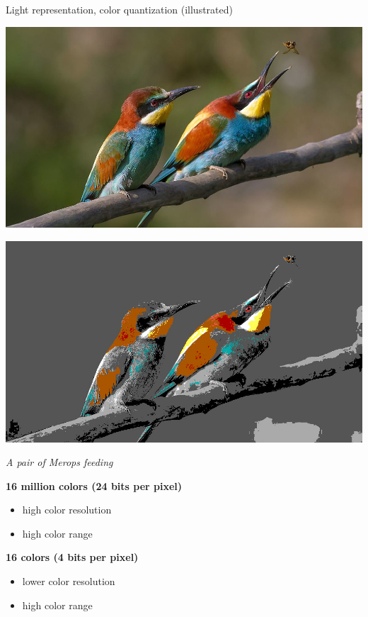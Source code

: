 \begin{frame}{Light representation, color quantization (illustrated)}
  \begin{minipage}[b]{0.45\textwidth}
    \centering
    \includegraphics[width=\textwidth]{slides/graphics-theory/pair-of-merops.jpg}
  \end{minipage}
  \hfill
  \begin{minipage}[b]{0.45\textwidth}
    \centering
    \includegraphics[width=\textwidth]{slides/graphics-theory/pair-of-merops-16-colors-range.jpg}
  \end{minipage}

  \begin{center}
     \textit{\small A pair of Merops feeding}
  \end{center}

  \begin{minipage}[b]{0.45\textwidth}
    \centering
    \textbf{16 million colors (24 bits per pixel)}
    \begin{itemize}
    \item high color resolution
    \item high color range
    \end{itemize}
  \end{minipage}
  \hfill
  \begin{minipage}[b]{0.45\textwidth}
    \centering
    \textbf{16 colors (4 bits per pixel)}
    \begin{itemize}
    \item lower color resolution
    \item high color range
    \end{itemize}
  \end{minipage}
\end{frame}

